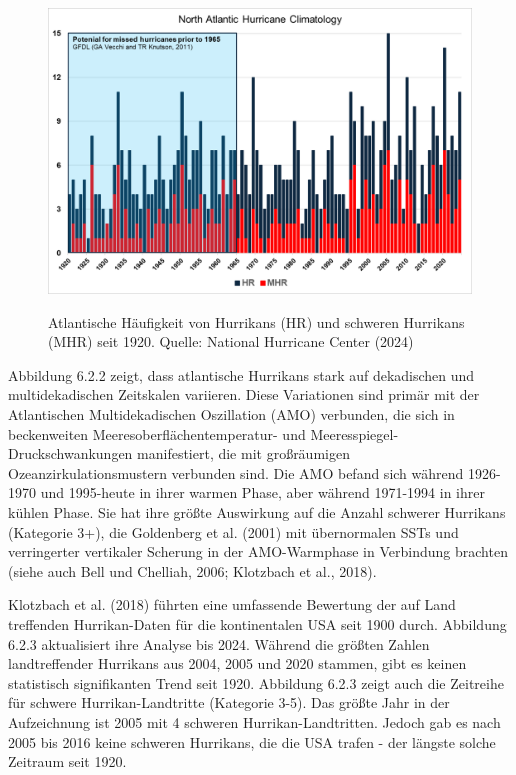 \documentclass[12pt,paper=a4,DIV=12,parskip=never,chapterprefix=false,headings=standardclasses]{scrreprt}
\begin{document}
\begin{figure}[H]
\begin{center}
\includegraphics[width=1.0\textwidth]{bilder/bilderKlima-0038.png}\\[1cm]
\end{center}
\caption{Atlantische Häufigkeit von Hurrikans (HR) und schweren Hurrikans (MHR) seit 1920. Quelle: National Hurricane Center (2024)}
\end{figure}

Abbildung 6.2.2 zeigt, dass atlantische Hurrikans stark auf dekadischen und multidekadischen Zeitskalen variieren. Diese Variationen sind primär mit der Atlantischen Multidekadischen Oszillation (AMO) verbunden, die sich in beckenweiten Meeresoberflächentemperatur- und Meeresspiegel-Druckschwankungen manifestiert, die mit großräumigen Ozeanzirkulationsmustern verbunden sind. Die AMO befand sich während 1926-1970 und 1995-heute in ihrer warmen Phase, aber während 1971-1994 in ihrer kühlen Phase. Sie hat ihre größte Auswirkung auf die Anzahl schwerer Hurrikans (Kategorie 3+), die Goldenberg et al. (2001) mit übernormalen SSTs und verringerter vertikaler Scherung in der AMO-Warmphase in Verbindung brachten (siehe auch Bell und Chelliah, 2006; Klotzbach et al., 2018).

Klotzbach et al. (2018) führten eine umfassende Bewertung der auf Land treffenden Hurrikan-Daten für die kontinentalen USA seit 1900 durch. Abbildung 6.2.3 aktualisiert ihre Analyse bis 2024. Während die größten Zahlen landtreffender Hurrikans aus 2004, 2005 und 2020 stammen, gibt es keinen statistisch signifikanten Trend seit 1920. Abbildung 6.2.3 zeigt auch die Zeitreihe für schwere Hurrikan-Landtritte (Kategorie 3-5). Das größte Jahr in der Aufzeichnung ist 2005 mit 4 schweren Hurrikan-Landtritten. Jedoch gab es nach 2005 bis 2016 keine schweren Hurrikans, die die USA trafen - der längste solche Zeitraum seit 1920.
\end{document}
